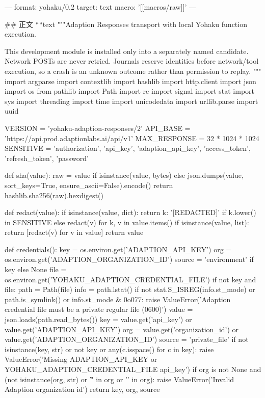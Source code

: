 ---
format: yohaku/0.2
target: text
macro: '[[macros/raw]]'
---

## 正文
````text
"""Adaption Responses transport with local Yohaku function execution.

This development module is installed only into a separately named candidate.
Network POSTs are never retried. Journals reserve identities before network/tool
execution, so a crash is an unknown outcome rather than permission to replay.
"""
import argparse
import contextlib
import hashlib
import http.client
import json
import os
from pathlib import Path
import re
import signal
import stat
import sys
import threading
import time
import unicodedata
import urllib.parse
import uuid

VERSION = 'yohaku-adaption-responses/2'
API_BASE = 'https://api.prod.adaptionlabs.ai/api/v1'
MAX_RESPONSE = 32 * 1024 * 1024
SENSITIVE = {'authorization', 'api_key', 'adaption_api_key', 'access_token', 'refresh_token', 'password'}


def sha(value):
    raw = value if isinstance(value, bytes) else json.dumps(value, sort_keys=True, ensure_ascii=False).encode()
    return hashlib.sha256(raw).hexdigest()


def redact(value):
    if isinstance(value, dict):
        return {k: '[REDACTED]' if k.lower() in SENSITIVE else redact(v) for k, v in value.items()}
    if isinstance(value, list):
        return [redact(v) for v in value]
    return value


def credentials():
    key = os.environ.get('ADAPTION_API_KEY')
    org = os.environ.get('ADAPTION_ORGANIZATION_ID')
    source = 'environment' if key else None
    file = os.environ.get('YOHAKU_ADAPTION_CREDENTIAL_FILE')
    if not key and file:
        path = Path(file)
        info = path.lstat()
        if not stat.S_ISREG(info.st_mode) or path.is_symlink() or info.st_mode & 0o077:
            raise ValueError('Adaption credential file must be a private regular file (0600)')
        value = json.loads(path.read_bytes())
        key = value.get('api_key') or value.get('ADAPTION_API_KEY')
        org = value.get('organization_id') or value.get('ADAPTION_ORGANIZATION_ID')
        source = 'private_file'
    if not isinstance(key, str) or not key or any(c.isspace() for c in key):
        raise ValueError('Missing ADAPTION_API_KEY or YOHAKU_ADAPTION_CREDENTIAL_FILE api_key')
    if org is not None and (not isinstance(org, str) or '\r' in org or '\n' in org):
        raise ValueError('Invalid Adaption organization id')
    return key, org, source


